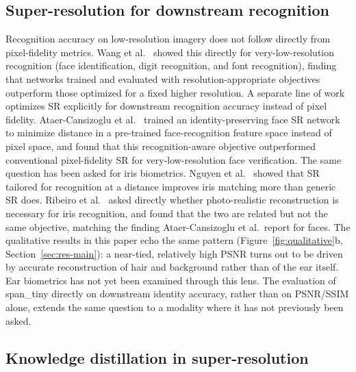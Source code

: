 \documentclass[11pt]{article}
\begin{document}
\subsection{Super-resolution for downstream recognition}

Recognition accuracy on low-resolution imagery does not follow directly from pixel-fidelity metrics. Wang et al.~\cite{wang2016vlrr} showed this directly for very-low-resolution recognition (face identification, digit recognition, and font recognition), finding that networks trained and evaluated with resolution-appropriate objectives outperform those optimized for a fixed higher resolution. A separate line of work optimizes SR explicitly for downstream recognition accuracy instead of pixel fidelity. Ataer-Cansizoglu et al.~\cite{ataer2019identity} trained an identity-preserving face SR network to minimize distance in a pre-trained face-recognition feature space instead of pixel space, and found that this recognition-aware objective outperformed conventional pixel-fidelity SR for very-low-resolution face verification. The same question has been asked for iris biometrics. Nguyen et al.~\cite{nguyen2011iris} showed that SR tailored for recognition at a distance improves iris matching more than generic SR does. Ribeiro et al.~\cite{ribeiro2019iris} asked directly whether photo-realistic reconstruction is necessary for iris recognition, and found that the two are related but not the same objective, matching the finding Ataer-Cansizoglu et al.\ report for faces. The qualitative results in this paper echo the same pattern (Figure~\ref{fig:qualitative}b, Section~\ref{sec:res-main}): a near-tied, relatively high PSNR turns out to be driven by accurate reconstruction of hair and background rather than of the ear itself. Ear biometrics has not yet been examined through this lens. The evaluation of span\_tiny directly on downstream identity accuracy, rather than on PSNR/SSIM alone, extends the same question to a modality where it has not previously been asked.

\subsection{Knowledge distillation in super-resolution}
\end{document}
